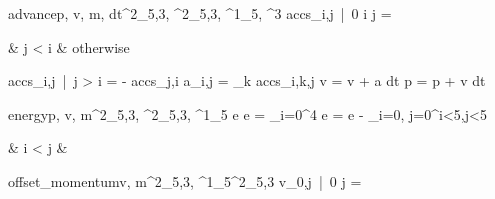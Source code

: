 \documentclass[12pt,a4paper]{book}
\begin{document}
\begin{eqcode}{advance}{p, v, m, dt}{^2_{5,3}, ^2_{5,3}, ^1_5, }{^3}
    accs_{i,j}\ |\ 0 \leq i   \leq j  =
        \begin{cases}
             & j < i  & otherwise
        \end{cases} \lend
    accs_{i,j}\ |\ j > i = - accs_{j,i} \lend
    a_{i,j} = \sum \limits_k accs_{i,k,j} \lend
    v = v + a \cdot dt \lend
    p = p + v \cdot dt \lend
     \lend
\end{eqcode}

\begin{eqcode}{energy}{p, v, m}{^2_{5,3},
    ^2_{5,3}, ^1_5}{}
    e \in {} \lend
    e = \sum\limits_{i=0}^{4}  \lend
    e = e - \sum\limits_{i=0, j=0}^{i<5,j<5}
    \begin{cases}
         & i < j  &  \lend
    \end{cases} \lend
\end{eqcode}

\begin{eqcode}{offset\_momentum}{v, m}{^2_{5,3},
    ^1_5}{^2_{5,3}}
    v_{0,j}\ |\ 0 \leq j  =  \lend
     \lend
\end{eqcode}
\end{document}
